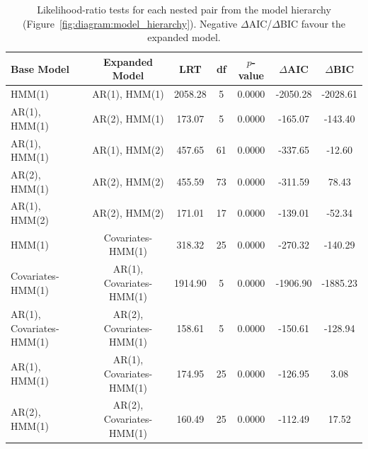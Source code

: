\begin{table}[ht]
\centering
\begin{tabular}{lcccccc}
\hline
Base Model & Expanded Model & LRT & df & $p$-value & $\Delta$AIC & $\Delta$BIC \\
\hline
HMM(1) & AR(1), HMM(1) & 2058.28 & 5 & 0.0000 & -2050.28 & -2028.61 \\
AR(1), HMM(1) & AR(2), HMM(1) & 173.07 & 5 & 0.0000 & -165.07 & -143.40 \\
AR(1), HMM(1) & AR(1), HMM(2) & 457.65 & 61 & 0.0000 & -337.65 & -12.60 \\
AR(2), HMM(1) & AR(2), HMM(2) & 455.59 & 73 & 0.0000 & -311.59 & 78.43 \\
AR(1), HMM(2) & AR(2), HMM(2) & 171.01 & 17 & 0.0000 & -139.01 & -52.34 \\
HMM(1) & Covariates-HMM(1) & 318.32 & 25 & 0.0000 & -270.32 & -140.29 \\
Covariates-HMM(1) & AR(1), Covariates-HMM(1) & 1914.90 & 5 & 0.0000 & -1906.90 & -1885.23 \\
AR(1), Covariates-HMM(1) & AR(2), Covariates-HMM(1) & 158.61 & 5 & 0.0000 & -150.61 & -128.94 \\
AR(1), HMM(1) & AR(1), Covariates-HMM(1) & 174.95 & 25 & 0.0000 & -126.95 & 3.08 \\
AR(2), HMM(1) & AR(2), Covariates-HMM(1) & 160.49 & 25 & 0.0000 & -112.49 & 17.52 \\
\hline
\end{tabular}
\caption{Likelihood-ratio tests for each nested pair from the model hierarchy (Figure~\ref{fig:diagram:model_hierarchy}). Negative $\Delta$AIC/$\Delta$BIC favour the expanded model.}
\label{tab:lrt_comparison}
\end{table}
